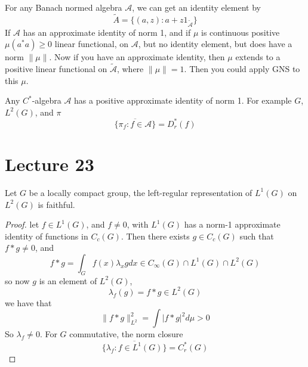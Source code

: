 For any Banach normed algebra $\mathcal{A}$, we can get an identity element by 
\begin{equation*}
    \tilde{A}=\{(a,z): a+z1_{\tilde{\mathcal{A}}}\}
\end{equation*}
If $\mathcal{A}$ has an approximate identity of norm 1, and if $\mu$ is continuous positive $\mu(a^*a)\geq 0$ linear functional, on $\mathcal{A}$, but no identity element, but does have a norm $\|\mu\|$. Now if you have an approximate identity, then $\mu$ extends to a positive linear functional on $\tilde{\mathcal{A}}$, where $\|\mu\|=1$. Then you could apply GNS to this $\mu$.
\begin{note}
    Any $C^*$-algebra $\mathcal{A}$ has a positive approximate identity of norm 1. For example $G$, $L^2(G)$, and $\pi$
    \begin{equation*}
        \overline{\{\pi_f:f\in\mathcal{A}\}}=D_r^*(f)
    \end{equation*}
\end{note}


\section{Lecture 23}
\begin{proposition}
    Let $G$ be a locally compact group, the left-regular representation of $L^1(G)$ on $L^2(G)$ is faithful.
\end{proposition}
\begin{proof}
    let $f\in L^1(G)$, and $f\neq 0$, with $L^1(G)$ has a norm-1 approximate identity of functions in $C_c(G)$. Then there exists $g\in C_c(G)$ such that $f\ast g\neq 0$, and
    \begin{equation*}
        f\ast g=\int_G f(x)\lambda_xgdx\in C_\infty(G)\cap L^1(G)\cap L^2(G)
    \end{equation*}
    so now $g$ is an element of $L^2(G)$,
    \begin{equation*}
        \lambda_f(g)=f\ast g\in L^2(G)
    \end{equation*}
    we have that
    \begin{equation*}
        \|f\ast g\|_{L^2}^2=\int|f\ast g|^2d\mu>0
    \end{equation*}
    So $\lambda_f\neq 0$. For $G$ commutative, the norm closure
    \begin{equation*}
        \overline{\{\lambda_f: f\in L^1(G)\}}=C_r^*(G)
    \end{equation*}
\end{proof}

